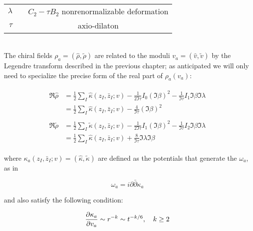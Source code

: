 ~\\

\begin{tabular}{r | l c}
	$\lambda$ & & $C_2 - \tau B_2$ nonrenormalizable deformation\\
	$\tau$ & & axio-dilaton
\end{tabular}\\

The chiral fields $\rho_a = (\hat \rho,\tilde{\rho})$ are related to the moduli $v_a = (\hat v, \tilde v)$ by the Legendre transform described in the previous chapter; as anticipated we will only need to specialize the precise form of the real part of $\rho_a(v_a)$:

\begin{align}
\begin{split}
	\Re \hat \rho &= \frac{1}{2} \sum_I \hat\kappa(z_I,\bar z_I ; v)  - \frac{1}{2\Im \tau} I_0 (\Im \beta)^2 - \frac{1}{\Im \tau} I_1 \Im \beta \Im \lambda\\
	&= \frac{1}{2} \sum_I \hat\kappa(z_I,\bar z_I; v) -\frac{4}{\Im\tau} \left( \Im\beta \right)^2
	\label{rhofunv}
\end{split}
\end{align}
\begin{align}
\begin{split}
	\Re \tilde{\rho} &= \frac{1}{2} \sum_I \tilde\kappa(z_I,\bar z_I; v) - \frac{1}{2 \Im \tau}I_1(\Im\beta)^2-\frac{1}{\Im\tau}I_2 \Im\beta \Im\lambda\\
	&= \frac{1}{2} \sum_I \hat\kappa(z_I,\bar z_I; v) + \frac{8}{\Im\tau} \Im\lambda \Im\beta 
	\label{}
\end{split}
\end{align}

where $\kappa_a(z_I,\bar z_I; v) = (\hat\kappa,\tilde\kappa)$ are defined as the potentials that generate the $\omega_a$, as in

\begin{equation}
	\omega_a = i \partial\bar \partial \kappa_a
	\label{}
\end{equation}

and also satisfy the following condition:

\begin{equation}
	\frac{\partial\kappa_a}{\partial v_a} \sim r^{-k} \sim t^{-k/6}, \quad k \geq 2
	\label{potentialcondition}
\end{equation}



